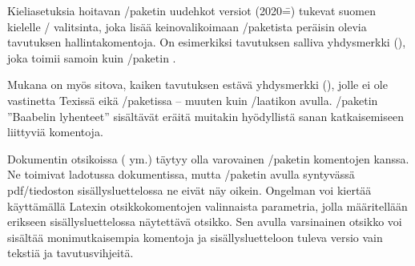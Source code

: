 
Kieli\-asetuksia hoitavan \-/paketin uudehkot
versiot (2020\==) tukevat suomen kielelle \-/
valitsinta, joka lisää keinovalikoimaan \-/paketista
peräisin olevia tavutuksen hallintakomentoja. On esimerkiksi tavutuksen
salliva yhdysmerkki (\koodi{\textquotedbl-}), joka toimii samoin kuin
\-/paketin \koodi{\keno-/}.

Mukana on myös sitova, kaiken tavutuksen estävä yhdysmerkki
(\koodi{\textquotedbl\textasciitilde}), jolle ei ole vastinetta Texissä
eikä \-/paketissa -- muuten kuin \-/laatikon avulla. \-/paketin ''Baabelin
lyhenteet'' sisältävät eräitä muitakin hyödyllistä sanan katkaisemiseen
liittyviä komentoja.

Dokumentin otsikoissa ( ym.) täytyy olla varovainen
\-/paketin komentojen kanssa. Ne toimivat ladotussa
dokumentissa, mutta \-/paketin avulla syntyvässä
pdf\-/tiedoston sisällysluettelossa ne eivät näy oikein. Ongelman voi
kiertää käyttämällä Latexin otsikkokomentojen valinnaista parametria,
jolla määritellään erikseen sisällysluettelossa näytettävä otsikko. Sen
avulla varsinainen otsikko voi sisältää monimutkaisempia komentoja ja
sisällysluetteloon tuleva versio vain tekstiä ja tavutusvihjeitä.

